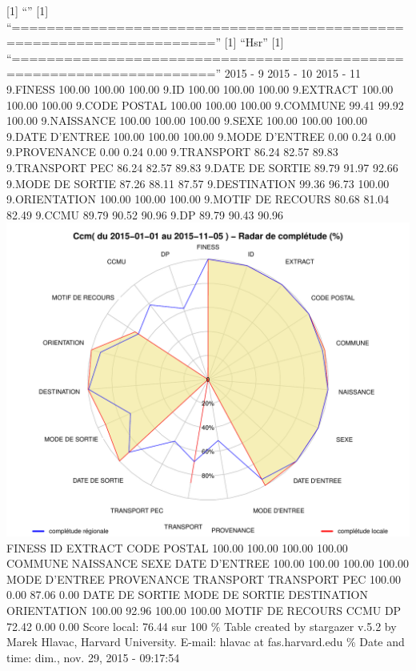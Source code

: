 \documentclass[]{article}
\begin{document}
{[}1{]} ``'' {[}1{]}
``=====================================================================''
{[}1{]} ``Hsr'' {[}1{]}
``=====================================================================''
2015 - 9 2015 - 10 2015 - 11 9.FINESS 100.00 100.00 100.00 9.ID 100.00
100.00 100.00 9.EXTRACT 100.00 100.00 100.00 9.CODE POSTAL 100.00 100.00
100.00 9.COMMUNE 99.41 99.92 100.00 9.NAISSANCE 100.00 100.00 100.00
9.SEXE 100.00 100.00 100.00 9.DATE D'ENTREE 100.00 100.00 100.00 9.MODE
D'ENTREE 0.00 0.24 0.00 9.PROVENANCE 0.00 0.24 0.00 9.TRANSPORT 86.24
82.57 89.83 9.TRANSPORT PEC 86.24 82.57 89.83 9.DATE DE SORTIE 89.79
91.97 92.66 9.MODE DE SORTIE 87.26 88.11 87.57 9.DESTINATION 99.36 96.73
100.00 9.ORIENTATION 100.00 100.00 100.00 9.MOTIF DE RECOURS 80.68 81.04
82.49 9.CCMU 89.79 90.52 90.96 9.DP 89.79 90.43 90.96
\includegraphics{completude_files/figure-latex/finess-19.pdf} FINESS ID
EXTRACT CODE POSTAL 100.00 100.00 100.00 100.00 COMMUNE NAISSANCE SEXE
DATE D'ENTREE 100.00 100.00 100.00 100.00 MODE D'ENTREE PROVENANCE
TRANSPORT TRANSPORT PEC 100.00 0.00 87.06 0.00 DATE DE SORTIE MODE DE
SORTIE DESTINATION ORIENTATION 100.00 92.96 100.00 100.00 MOTIF DE
RECOURS CCMU DP 72.42 0.00 0.00 Score local: 76.44 sur 100 \% Table
created by stargazer v.5.2 by Marek Hlavac, Harvard University. E-mail:
hlavac at fas.harvard.edu \% Date and time: dim., nov. 29, 2015 -
09:17:54
\end{document}
